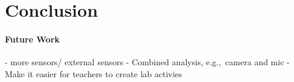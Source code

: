 \documentclass{sigchi}
\newcommand{\eg}{e.g.,\ }
\begin{document}

\section{Conclusion}

\paragraph{Future Work}
- more sensors/ external sensors
- Combined analysis, \eg camera and mic
- Make it easier for teachers to create lab activies




\end{document}
